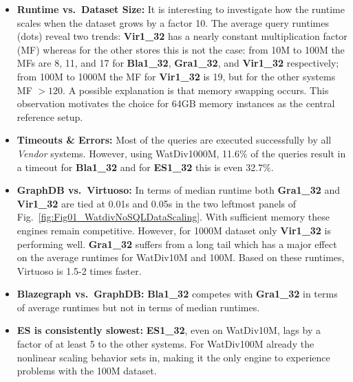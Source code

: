 \documentclass[twocolumn]{bmcart}%
\begin{document}
\begin{itemize}
	\item \textbf{Runtime vs.\ Dataset Size:} It is interesting to investigate how the runtime scales when the dataset grows by a factor 10. The average query runtimes (dots) reveal two trends: \textbf{Vir1\_32} has a nearly constant multiplication factor (MF) whereas for the other stores this is not the case: from 10M to 100M the MFs are 8, 11, and 17 for \textbf{Bla1\_32}, \textbf{Gra1\_32}, and \textbf{Vir1\_32} respectively; from 100M to 1000M the MF for \textbf{Vir1\_32} is 19, but for the other systems MF $> 120$. A possible explanation is that memory swapping occurs. This observation motivates the choice for 64GB memory instances as the central reference setup.
	\item \textbf{Timeouts \& Errors:} Most of the queries are executed successfully by all \emph{Vendor} systems. However, using WatDiv1000M, 11.6\% of the queries result in a timeout for \textbf{Bla1\_32}  and for \textbf{ES1\_32} this is even 32.7\%. 
	
	\item \textbf{GraphDB vs.\ Virtuoso:} In terms of median runtime both \textbf{Gra1\_32} and \textbf{Vir1\_32} are tied at 0.01s and 0.05s in the two leftmost panels of Fig.~\ref{fig:Fig01_WatdivNoSQLDataScaling}. With sufficient memory these engines remain competitive. However, for 1000M dataset only \textbf{Vir1\_32} is performing well. %
	\textbf{Gra1\_32} suffers from a long tail which has a major effect on the average runtimes for WatDiv10M and 100M. Based on these runtimes, Virtuoso is 1.5-2 times faster.
	
	\item \textbf{Blazegraph vs.\ GraphDB:} \textbf{Bla1\_32} competes with \textbf{Gra1\_32} in terms of average runtimes but not in terms of median runtimes.
	
	\item \textbf{ES is consistently slowest:} \textbf{ES1\_32}, even on WatDiv10M, lags by a factor of at least 5 to the other systems. For WatDiv100M already the nonlinear scaling behavior sets in, making it the only engine to experience problems with the 100M dataset. 
\end{itemize}
%
\end{document}
